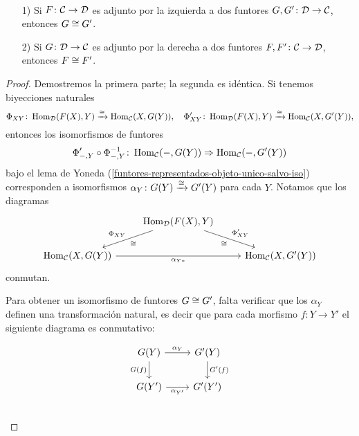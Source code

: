 \documentclass{article}
\numberwithin{equation}{section}
\theoremstyle{definition}
\begin{document}
\begin{proposicion}
  ~

  \begin{enumerate}
  \item[1)] Si $F\colon \mathcal{C} \to \mathcal{D}$ es adjunto por la izquierda a
    dos funtores $G, G'\colon \mathcal{D} \to \mathcal{C}$, entonces $G \cong G'$.

  \item[2)] Si $G\colon \mathcal{D} \to \mathcal{C}$ es adjunto por la derecha a
    dos funtores $F, F'\colon \mathcal{C} \to \mathcal{D}$, entonces $F \cong F'$.
  \end{enumerate}

  \begin{proof}
    Demostremos la primera parte; la segunda es idéntica. Si tenemos biyecciones
    naturales
    \[ \Phi_{XY}\colon \operatorname{Hom}_\mathcal{D} (F (X), Y) \xrightarrow{\cong} \operatorname{Hom}_\mathcal{C} (X, G (Y)), \quad
       \Phi'_{XY}\colon \operatorname{Hom}_\mathcal{D} (F (X), Y) \xrightarrow{\cong} \operatorname{Hom}_\mathcal{C} (X, G' (Y)), \]
    entonces los isomorfismos de funtores
    $$\Phi'_{-,Y}\circ\Phi_{-,Y}^{-1}\colon \operatorname{Hom}_\mathcal{C} (-, G (Y))\Rightarrow \operatorname{Hom}_\mathcal{C} (-, G' (Y))$$
    bajo el lema de Yoneda
    (\ref{funtores-representados-objeto-unico-salvo-iso}) corresponden a
    isomorfismos $\alpha_Y\colon G (Y) \xrightarrow{\cong} G' (Y)$ para cada
    $Y$. Notamos que los diagramas
    \begin{equation}
      \label{eqn:alpha-conmuta-con-biyecciones}
      \begin{tikzcd}
        & \Hom_\vcateg{D} (F(X), Y) \ar{dl}[swap]{\Phi_{XY}}{\isom}\ar{dr}{\Phi'_{XY}}[swap]{\isom} \\
        \Hom_\vcateg{C} (X,G (Y)) \ar{rr}[swap]{\alpha_{Y*}} & & \Hom_\vcateg{C} (X,G' (Y))
      \end{tikzcd}
    \end{equation}
    conmutan.

    Para obtener un isomorfismo de funtores $G \cong G'$, falta verificar que
    los $\alpha_Y$ definen una transformación natural, es decir que para cada
    morfismo $f\colon Y\to Y'$ el siguiente diagrama es conmutativo:

    \[ \begin{tikzcd}
        G (Y) \ar{r}{\alpha_Y}\ar{d}[swap]{G (f)} & G' (Y)\ar{d}{G' (f)} \\
        G (Y') \ar{r}[swap]{\alpha_{Y'}} & G' (Y') \\
      \end{tikzcd} \]


\end{proof}
\end{proposicion}
\end{document}
